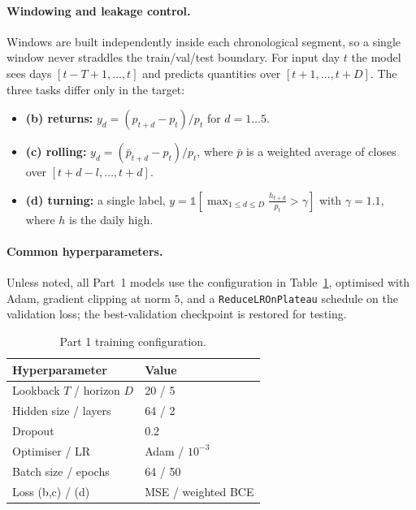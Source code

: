 \documentclass[10pt,twocolumn]{article}
\begin{document}
\paragraph{Windowing and leakage control.} Windows are built independently inside
each chronological segment, so a single window never straddles the train/val/test
boundary. For input day $t$ the model sees days $[t{-}T{+}1,\dots,t]$ and predicts
quantities over $[t{+}1,\dots,t{+}D]$. The three tasks differ only in the target:
\begin{itemize}[leftmargin=1.3em,itemsep=1pt,topsep=2pt]
  \item \textbf{(b) returns:} $y_d = (p_{t+d}-p_t)/p_t$ for $d{=}1\dots5$.
  \item \textbf{(c) rolling:} $y_d = (\bar p_{t+d}-p_t)/p_t$, where $\bar p$ is a
        weighted average of closes over $[t{+}d{-}l,\dots,t{+}d]$.
  \item \textbf{(d) turning:} a single label, $y=\mathbb{1}\!\left[\max_{1\le d\le
        D}\tfrac{h_{t+d}}{p_t} > \gamma\right]$ with $\gamma{=}1.1$, where $h$ is
        the daily high.
\end{itemize}

\paragraph{Common hyperparameters.} Unless noted, all Part~1 models use the
configuration in Table~\ref{tab:hparams}, optimised with Adam, gradient clipping
at norm $5$, and a \texttt{ReduceLROnPlateau} schedule on the validation loss; the
best-validation checkpoint is restored for testing.

\begin{table}[t]
\centering
\caption{Part 1 training configuration.}
\label{tab:hparams}
\begin{tabular}{ll}
\toprule
Hyperparameter & Value \\
\midrule
Lookback $T$ / horizon $D$ & 20 / 5 \\
Hidden size / layers       & 64 / 2 \\
Dropout                    & 0.2 \\
Optimiser / LR             & Adam / $10^{-3}$ \\
Batch size / epochs        & 64 / 50 \\
Loss (b,c) / (d)           & MSE / weighted BCE \\
\bottomrule
\end{tabular}
\end{table}
\end{document}
